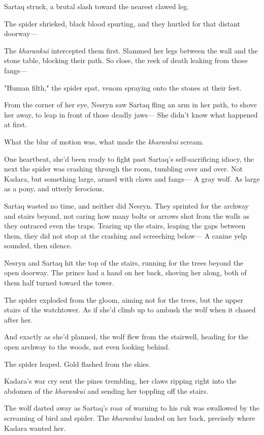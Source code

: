 Sartaq struck, a brutal slash toward the nearest clawed leg.

The spider shrieked, black blood spurting, and they hurtled for that distant doorway---

The \emph{kharankui} intercepted them first. Slammed her legs between the wall and the stone table, blocking their path. So close, the reek of death leaking from those fangs---

"Human filth," the spider spat, venom spraying onto the stones at their feet.

From the corner of her eye, Nesryn saw Sartaq fling an arm in her path, to shove her away, to leap in front of those deadly jaws--- She didn't know what happened at first.

What the blur of motion was, what made the \emph{kharankui} scream.

One heartbeat, she'd been ready to fight past Sartaq's self-sacrificing idiocy, the next  the spider was crashing through the room, tumbling over and over. Not Kadara, but something large, armed with claws and fangs--- A gray wolf. As large as a pony, and utterly ferocious.

Sartaq wasted no time, and neither did Nesryn. They sprinted for the archway and stairs beyond, not caring how many bolts or arrows shot from the walls as they outraced even the traps. Tearing up the stairs, leaping the gaps between them, they did not stop at the crashing and screeching below--- A canine yelp sounded, then silence.

Nesryn and Sartaq hit the top of the stairs, running for the trees beyond the open doorway. The prince had a hand on her back, shoving her along, both of them half turned toward the tower.

The spider exploded from the gloom, aiming not for the trees, but the upper stairs of the watchtower. As if she'd climb up to ambush the wolf when it chased after her.

And exactly as she'd planned, the wolf flew from the stairwell, heading for the open archway to the woods, not even looking behind.

The spider leaped. Gold flashed from the skies.

Kadara's war cry sent the pines trembling, her claws ripping right into the abdomen of the \emph{kharankui} and sending her toppling off the stairs.

The wolf darted away as Sartaq's roar of warning to his ruk was swallowed by the screaming of bird and spider. The \emph{kharankui}
landed on her back, precisely where Kadara wanted her.

